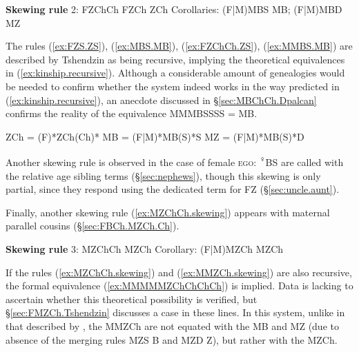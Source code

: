 \begin{exe}
\ex 
\begin{xlist}
\ex \label{ex:FZChCh.ZS}
\glt \textbf{Skewing rule} 2: FZChCh \fl{} FZCh \fl{} ZCh
\ex \label{ex:MMBS.MB}
\glt Corollaries:  (F|M)MBS \fl{} MB; (F|M)MBD \fl{} MZ
\end{xlist}
\end{exe}
 
The rules (\ref{ex:FZS.ZS}), (\ref{ex:MBS.MB}), (\ref{ex:FZChCh.ZS}), (\ref{ex:MMBS.MB}) are described by Tshendzin as being recursive, implying the theoretical equivalences in (\ref{ex:kinship.recursive}). Although a considerable amount of genealogies would be needed to confirm whether the system indeed works in the way predicted in (\ref{ex:kinship.recursive}), an anecdote discussed in §\ref{sec:MBChCh.Dpalcan} confirms the reality of the equivalence MMMBSSSS = MB.
  
 \begin{exe}
 \ex \label{ex:kinship.recursive}
\begin{xlist}
\ex \label{ex:FFFFZCh}
\glt ZCh = (F)*ZCh(Ch)*
\ex \label{ex:MBSSSS}
\glt MB = (F|M)*MB(S)*S
 \ex \label{ex:MBSSSD}
\glt MZ = (F|M)*MB(S)*D
\end{xlist}
\end{exe}

Another skewing rule is observed in the case of female \textsc{ego}:  \textsuperscript{♀}BS are called with the relative age sibling terms (§\ref{sec:nephews}), though this skewing is only partial, since they respond using the dedicated term  for FZ (§\ref{sec:uncle.aunt}).

Finally, another skewing rule (\ref{ex:MZChCh.skewing}) appears with maternal parallel cousins (§\ref{sec:FBCh.MZCh.Ch}).

\begin{exe}
\ex 
\begin{xlist}
\ex \label{ex:MZChCh.skewing}
\glt \textbf{Skewing rule} 3: MZChCh \fl{} MZCh
\ex \label{ex:MMZCh.skewing}
\glt Corollary:  (F|M)MZCh \fl{} MZCh
\end{xlist}
\end{exe}

If the rules (\ref{ex:MZChCh.skewing}) and (\ref{ex:MMZCh.skewing}) are also recursive, the formal equivalence (\ref{ex:MMMMMZChChChCh}) is implied. Data is lacking to ascertain whether this theoretical possibility is verified, but §\ref{sec:FMZCh.Tshendzin} discusses a case in these lines. In this system, unlike in that described by \citet[361]{lounsbury64crow}, the MMZCh are not equated with the MB and MZ (due to absence of the merging rules MZS \fl{} B and MZD \fl{} Z), but rather with the MZCh. 


